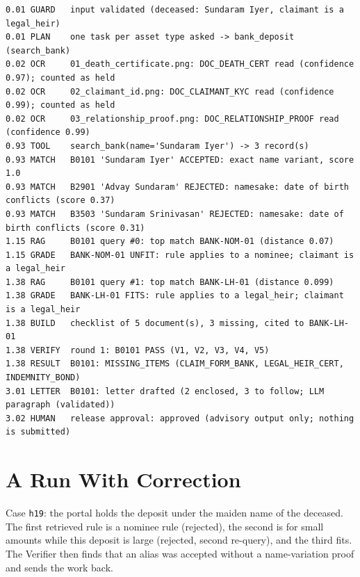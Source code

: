 \begin{lstlisting}[numbers=none,basicstyle=\ttfamily\tiny\setstretch{1.0},caption={Trace of a successful run (case e01), condensed.},label={lst:e01}]
0.01 GUARD   input validated (deceased: Sundaram Iyer, claimant is a legal_heir)
0.01 PLAN    one task per asset type asked -> bank_deposit (search_bank)
0.02 OCR     01_death_certificate.png: DOC_DEATH_CERT read (confidence 0.97); counted as held
0.02 OCR     02_claimant_id.png: DOC_CLAIMANT_KYC read (confidence 0.99); counted as held
0.02 OCR     03_relationship_proof.png: DOC_RELATIONSHIP_PROOF read (confidence 0.99)
0.93 TOOL    search_bank(name='Sundaram Iyer') -> 3 record(s)
0.93 MATCH   B0101 'Sundaram Iyer' ACCEPTED: exact name variant, score 1.0
0.93 MATCH   B2901 'Advay Sundaram' REJECTED: namesake: date of birth conflicts (score 0.37)
0.93 MATCH   B3503 'Sundaram Srinivasan' REJECTED: namesake: date of birth conflicts (score 0.31)
1.15 RAG     B0101 query #0: top match BANK-NOM-01 (distance 0.07)
1.15 GRADE   BANK-NOM-01 UNFIT: rule applies to a nominee; claimant is a legal_heir
1.38 RAG     B0101 query #1: top match BANK-LH-01 (distance 0.099)
1.38 GRADE   BANK-LH-01 FITS: rule applies to a legal_heir; claimant is a legal_heir
1.38 BUILD   checklist of 5 document(s), 3 missing, cited to BANK-LH-01
1.38 VERIFY  round 1: B0101 PASS (V1, V2, V3, V4, V5)
1.38 RESULT  B0101: MISSING_ITEMS (CLAIM_FORM_BANK, LEGAL_HEIR_CERT, INDEMNITY_BOND)
3.01 LETTER  B0101: letter drafted (2 enclosed, 3 to follow; LLM paragraph (validated))
3.02 HUMAN   release approval: approved (advisory output only; nothing is submitted)
\end{lstlisting}

\section{A Run With Correction}
Case \texttt{h19}: the portal holds the deposit under the maiden name of the deceased. The first retrieved rule is a nominee rule (rejected), the second is for small amounts while this deposit is large (rejected, second re-query), and the third fits. The Verifier then finds that an alias was accepted without a name-variation proof and sends the work back.

